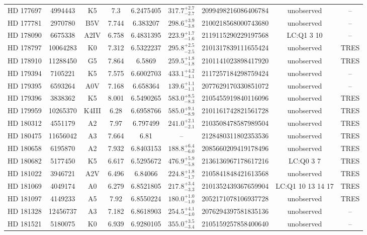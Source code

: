 \begin{table*}
\begin{tabular}{ccccccccc}
HD 177697 & 4994443 & K5 & 7.3 & 6.2475405 & $317.7^{+2.7}_{-2.7}$ & 2099498216086406784 & unobserved & -- \\
HD 177781 & 2970780 & B5V & 7.744 & 6.383207 & $298.6^{+3.9}_{-3.8}$ & 2100218568000743680 & unobserved & -- \\
HD 178090 & 6675338 & A2IV & 6.758 & 6.4831395 & $223.9^{+1.7}_{-1.6}$ & 2119115290229197568 & LC:Q1 3 10 & -- \\
HD 178797 & 10064283 & K0 & 7.312 & 6.5322237 & $295.8^{+2.5}_{-2.5}$ & 2101317839111655424 & unobserved & TRES \\
HD 178910 & 11288450 & G5 & 7.864 & 6.5869 & $259.5^{+1.8}_{-1.8}$ & 2101141023898417920 & unobserved & TRES \\
HD 179394 & 7105221 & K5 & 7.575 & 6.6002703 & $433.1^{+4.2}_{-4.1}$ & 2117257184298759424 & unobserved & -- \\
HD 179395 & 6593264 & A0V & 7.168 & 6.658364 & $139.6^{+1.1}_{-1.1}$ & 2077629170330851072 & unobserved & -- \\
HD 179396 & 3838362 & K5 & 8.001 & 6.5490265 & $583.0^{+8.5}_{-8.3}$ & 2105455919840116096 & unobserved & TRES \\
HD 179959 & 10265370 & K4III & 6.28 & 6.6958766 & $585.0^{+9.1}_{-8.9}$ & 2101161742821561728 & unobserved & TRES \\
HD 180312 & 4551179 & A2 & 7.97 & 6.797499 & $241.0^{+2.1}_{-2.1}$ & 2103508478587989504 & unobserved & TRES \\
HD 180475 & 11656042 & A3 & 7.664 & 6.81 & -- & 2128480311802353536 & unobserved & TRES \\
HD 180658 & 6195870 & A2 & 7.932 & 6.8403153 & $188.8^{+6.4}_{-6.0}$ & 2085660209419178496 & unobserved & TRES \\
HD 180682 & 5177450 & K5 & 6.617 & 6.5295672 & $476.9^{+5.9}_{-5.8}$ & 2136136967178617216 & LC:Q0 3 7 & TRES \\
HD 181022 & 3946721 & A2V & 6.496 & 6.84066 & $224.8^{+1.8}_{-1.7}$ & 2105841848421613568 & unobserved & TRES \\
HD 181069 & 4049174 & A0 & 6.279 & 6.8521805 & $217.8^{+3.4}_{-3.3}$ & 2101352439367659904 & LC:Q1 10 13 14 17 & TRES \\
HD 181097 & 4149233 & A5 & 7.92 & 6.8550224 & $180.0^{+1.0}_{-1.0}$ & 2052171078106937728 & unobserved & TRES \\
HD 181328 & 12456737 & A3 & 7.182 & 6.8618903 & $254.5^{+4.1}_{-4.0}$ & 2076294397581835136 & unobserved & -- \\
HD 181521 & 5180075 & K0 & 6.939 & 6.9280105 & $355.0^{+3.5}_{-3.4}$ & 2105159257858400640 & unobserved & -- \\

\end{tabular}
\end{table*}
